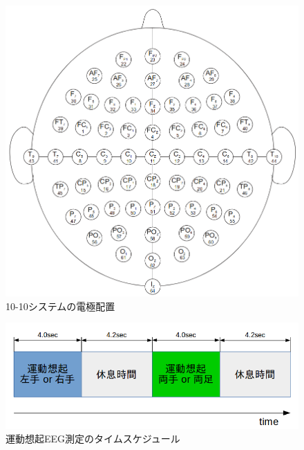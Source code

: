 \begin{figure}[t]
    \centering
    \includegraphics[width=12cm]{images/system1010.png}
    \caption{10-10システムの電極配置}
    \label{fig:10system}
\end{figure}
\begin{figure}[t]
    \centering
    \includegraphics[width=12cm]{images/motorimage.png}
    \caption{運動想起EEG測定のタイムスケジュール}
    \label{fig:motorimage}
\end{figure}


